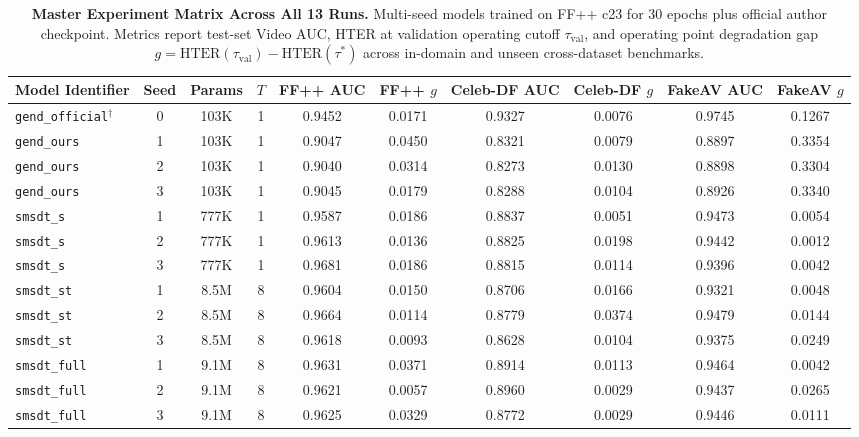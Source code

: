 \begin{table}[t]
\centering
\small
\caption{\textbf{Master Experiment Matrix Across All 13 Runs.} Multi-seed models trained on FF++ c23 for 30 epochs plus official author checkpoint. Metrics report test-set Video AUC, HTER at validation operating cutoff $\tau_{\text{val}}$, and operating point degradation gap $g = \text{HTER}(\tau_{\text{val}}) - \text{HTER}(\tau^*)$ across in-domain and unseen cross-dataset benchmarks.}
\label{tab:master_matrix}
\begin{tabular}{l c c c c c c c c c}
\toprule
\textbf{Model Identifier} & \textbf{Seed} & \textbf{Params} & \textbf{$T$} & \textbf{FF++ AUC} & \textbf{FF++ $g$} & \textbf{Celeb-DF AUC} & \textbf{Celeb-DF $g$} & \textbf{FakeAV AUC} & \textbf{FakeAV $g$} \\
\midrule
\texttt{gend\_official}$^\dagger$ & 0 & 103K & 1 & 0.9452 & 0.0171 & 0.9327 & 0.0076 & 0.9745 & 0.1267 \\
\midrule
\texttt{gend\_ours} & 1 & 103K & 1 & 0.9047 & 0.0450 & 0.8321 & 0.0079 & 0.8897 & 0.3354 \\
\texttt{gend\_ours} & 2 & 103K & 1 & 0.9040 & 0.0314 & 0.8273 & 0.0130 & 0.8898 & 0.3304 \\
\texttt{gend\_ours} & 3 & 103K & 1 & 0.9045 & 0.0179 & 0.8288 & 0.0104 & 0.8926 & 0.3340 \\
\midrule
\texttt{smsdt\_s} & 1 & 777K & 1 & 0.9587 & 0.0186 & 0.8837 & 0.0051 & 0.9473 & 0.0054 \\
\texttt{smsdt\_s} & 2 & 777K & 1 & 0.9613 & 0.0136 & 0.8825 & 0.0198 & 0.9442 & 0.0012 \\
\texttt{smsdt\_s} & 3 & 777K & 1 & 0.9681 & 0.0186 & 0.8815 & 0.0114 & 0.9396 & 0.0042 \\
\midrule
\texttt{smsdt\_st} & 1 & 8.5M & 8 & 0.9604 & 0.0150 & 0.8706 & 0.0166 & 0.9321 & 0.0048 \\
\texttt{smsdt\_st} & 2 & 8.5M & 8 & 0.9664 & 0.0114 & 0.8779 & 0.0374 & 0.9479 & 0.0144 \\
\texttt{smsdt\_st} & 3 & 8.5M & 8 & 0.9618 & 0.0093 & 0.8628 & 0.0104 & 0.9375 & 0.0249 \\
\midrule
\texttt{smsdt\_full} & 1 & 9.1M & 8 & 0.9631 & 0.0371 & 0.8914 & 0.0113 & 0.9464 & 0.0042 \\
\texttt{smsdt\_full} & 2 & 9.1M & 8 & 0.9621 & 0.0057 & 0.8960 & 0.0029 & 0.9437 & 0.0265 \\
\texttt{smsdt\_full} & 3 & 9.1M & 8 & 0.9625 & 0.0329 & 0.8772 & 0.0029 & 0.9446 & 0.0111 \\
\bottomrule
\end{tabular}
\end{table}


